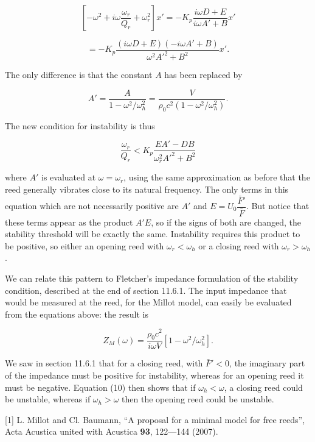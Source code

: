   $$\left[ -\omega^2 + i \omega \dfrac{\omega_r}{Q_r} + \omega_r^2 \right]x' = 
  -K_p \dfrac{i \omega D + E}{i \omega A' + B} x'$$ 

  $$=-K_p \dfrac{(i \omega D + E)(-i \omega A' + B)}{\omega^2 A'^2 + B^2} x' . 
  \tag{7}$$ 

  The only difference is that the constant $A$ has been replaced by 

  $$A'=\dfrac{A}{1-\omega^2/\omega_h^2}=\dfrac{V}{\rho_0 c^2 
  (1-\omega^2/\omega_h^2)} . \tag{8}$$ 

  The new condition for instability is thus 

  $$\dfrac{\omega_r}{Q_r} < K_p\dfrac{EA'-DB}{\omega_r^2 A'^2 + B^2} \tag{9}$$ 

  where $A'$ is evaluated at $\omega=\omega_r$, using the same approximation as 
  before that the reed generally vibrates close to its natural frequency. The 
  only terms in this equation which are not necessarily positive are $A'$ and 
  $E=U_0 \dfrac{\bar{F}'}{\bar{F}}$. But notice that these terms appear as the 
  product $A'E$, so if the signs of both are changed, the stability threshold 
  will be exactly the same. Instability requires this product to be positive, 
  so either an opening reed with $\omega_r < \omega_h$ or a closing reed with 
  $\omega_r > \omega_h$. 

  We can relate this pattern to Fletcher's impedance formulation of the 
  stability condition, described at the end of section 11.6.1. The input 
  impedance that would be measured at the reed, for the Millot model, can 
  easily be evaluated from the equations above: the result is 

  $$Z_M(\omega) = \dfrac{\rho_0 c^2}{i \omega 
  V}\left[1-\omega^2/\omega_h^2\right] .\tag{10}$$ 

  We saw in section 11.6.1 that for a closing reed, with $\bar{F}' < 0$, the 
  imaginary part of the impedance must be positive for instability, whereas for 
  an opening reed it must be negative. Equation (10) then shows that if 
  $\omega_h < \omega$, a closing reed could be unstable, whereas if $\omega_h > 
  \omega$ then the opening reed could be unstable. 

  \sectionreferences{}[1] L. Millot and Cl. Baumann, “A proposal for a minimal 
  model for free reeds”, Acta Acustica united with Acustica \textbf{93}, 
  122—144 (2007). 